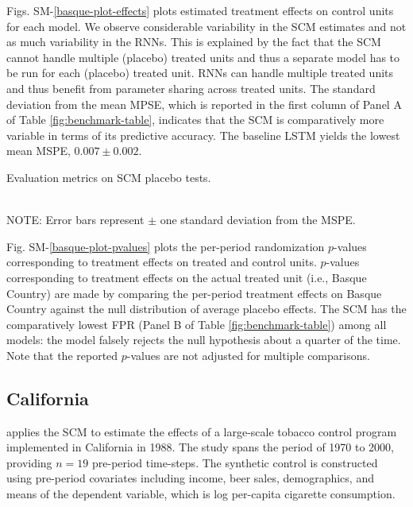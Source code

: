 \documentclass[hidelinks,12pt]{article}
\begin{document}
Figs. SM-\ref{basque-plot-effects} plots estimated treatment effects on control units for each model. We observe considerable variability in the SCM estimates and not as much variability in the RNNs. This is explained by the fact that the SCM cannot handle multiple (placebo) treated units and thus a separate model has to be run for each (placebo) treated unit. RNNs can handle multiple treated units and thus benefit from parameter sharing across treated units. The standard deviation from the mean MPSE, which is reported in the first column of Panel A of Table \ref{fig:benchmark-table}, indicates that the SCM is comparatively more variable in terms of its predictive accuracy. The baseline LSTM yields the lowest mean MSPE, $0.007 \pm 0.002$. 

\begin{table}[htbp]
\begin{center}
\caption{Evaluation metrics on SCM placebo tests.\label{fig:benchmark-table}}
\resizebox{\width}{!}{}
\resizebox{\width}{!}{}\\
\footnotesize{{NOTE: Error bars represent $\pm$ one standard deviation from the MSPE.}}
\end{center}
\end{table}

Fig. SM-\ref{basque-plot-pvalues} plots the per-period randomization $p$-values corresponding to treatment effects on treated and control units. $p$-values corresponding to treatment effects on the actual treated unit (i.e., Basque Country) are made by comparing the per-period treatment effects on Basque Country against the null distribution of average placebo effects. The SCM has the comparatively lowest FPR (Panel B of Table \ref{fig:benchmark-table}) among all models: the model falsely rejects the null hypothesis about a quarter of the time. Note that the reported $p$-values are not adjusted for multiple comparisons.

\subsection{California} 

\citet{abadie2010synthetic} applies the SCM to estimate the effects of a large-scale tobacco control program implemented in California in 1988. The study spans the period of 1970 to 2000, providing $n=19$ pre-period time-steps.  The synthetic control is constructed using pre-period covariates including income, beer sales, demographics, and means of the dependent variable, which is log per-capita cigarette consumption. 
\end{document}
